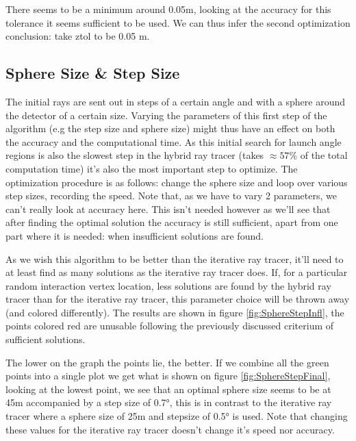 \newpage
There seems to be a minimum around 0.05m, looking at the
accuracy for this tolerance it seems sufficient to be used.  We can thus infer
the second optimization conclusion: take ztol to be 0.05 m.

\subsection{Sphere Size \& Step Size}
The initial rays are sent out in steps of a certain angle and with a sphere
around the detector of a certain size. Varying the parameters of this first
step of the algorithm (e.g the step size and sphere size) might thus have an
effect on both the accuracy and the computational time.  As this initial search
for launch angle regions is also the slowest step in the hybrid ray tracer (takes
$\approx 57\%$ of the total computation time)
it's also the most important step to optimize. The optimization procedure is as
follows: change the sphere size and loop over various step sizes, recording the
speed. Note that, as we have to vary 2 parameters, we can't really look at
accuracy here. This isn't needed however as we'll see that after finding the
optimal solution the accuracy is still sufficient, apart from one part where it is
needed: when insufficient solutions are found. 

As we wish this algorithm to be better than the iterative ray tracer, it'll need to
at least find as many solutions as the iterative ray tracer does.  If, for a
particular random interaction vertex location, less solutions are found by the
hybrid ray tracer than for the iterative ray tracer, this parameter choice will
be thrown away (and colored differently).  The results are shown in figure
\ref{fig:SphereStepInfl}, the points colored red are unusable following the previously
discussed criterium of sufficient solutions.

The lower on the graph the points lie, the better. If we combine all the green points into a single plot
we get what is shown on figure \ref{fig:SphereStepFinal},
looking at the lowest point, we see that an optimal sphere size seems to be at 45m accompanied
by a step size of 0.7°, this is in contrast to the iterative ray tracer where a sphere size of 25m and stepsize
of 0.5° is used. Note that changing these values for the iterative ray tracer doesn't change it's speed nor accuracy.

